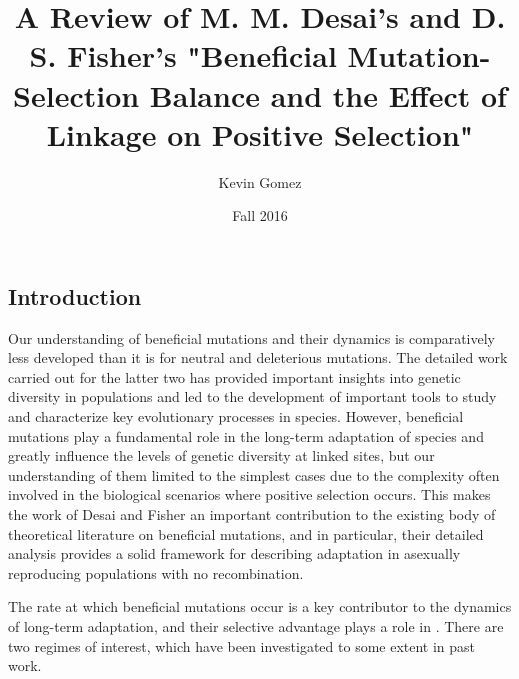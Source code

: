 \documentclass[12pt]{article}
\title{A Review of M. M. Desai's and D. S. Fisher's "Beneficial Mutation-Selection Balance and the Effect of Linkage on Positive Selection"}
\date{Fall 2016}
\author{Kevin Gomez}
\begin{document}
\maketitle
\newpage


\newpage
\subsection*{Introduction}
Our understanding of beneficial mutations and their dynamics is comparatively less developed than it is for neutral and deleterious mutations.  The detailed work carried out for the latter two has provided important insights into genetic diversity in populations and led to the development of important tools to study and characterize key evolutionary processes in species.  However, beneficial mutations play a fundamental role in the long-term adaptation of species and greatly influence the levels of genetic diversity at linked sites, but our understanding of them limited to the simplest cases due to the complexity often involved in the biological scenarios where positive selection occurs.  This makes the work of Desai and Fisher an important contribution to the existing body of theoretical literature on beneficial mutations, and in particular, their detailed analysis provides a solid framework for describing adaptation in asexually reproducing populations with no recombination.

The rate at which beneficial mutations occur is a key contributor to the dynamics of long-term adaptation, and their selective advantage plays a role in .  There are two regimes of interest, which have been investigated to some extent in past work.  



 
\end{document}
